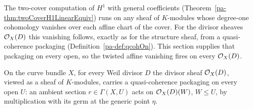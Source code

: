 The two-cover computation of \(H^1\) with general coefficients
(Theorem~\ref{pa-thm:twoCoverH1LinearEquiv}) runs on any sheaf of \(K\)-modules whose degree-one
cohomology vanishes over each affine chart of the cover. For the divisor sheaves \(\mathcal{O}_{X}(D)\)
this vanishing follows, exactly as for the structure sheaf, from a quasi-coherence packaging
(Definition~\ref{pa-def:qcohOn}). This section supplies that packaging on every open, so the twisted
affine vanishing fires on every \(\mathcal{O}_{X}(D)\).

\begin{theorem}
  \label{pa-thm:divisorSheaf_qcohOn}
  \leanok

  On the curve bundle \(X\), for every Weil divisor \(D\) the divisor sheaf \(\mathcal{O}_{X}(D)\),
  viewed as a sheaf of \(K\)-modules, carries a quasi-coherence packaging on every open \(U\): an
  ambient section \(r \in \Gamma(X, U)\) acts on \(\mathcal{O}_{X}(D)(W)\), \(W \le U\), by multiplication
  with its germ at the generic point \(\eta\).
\end{theorem}
